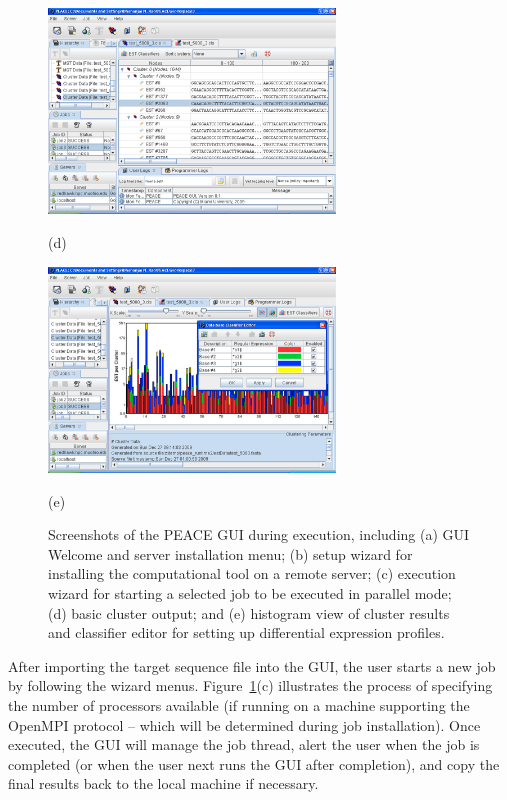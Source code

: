 \documentclass[a4,center,fleqn]{NAR}
\newcommand{\peace} {{\small PEACE}}
\begin{document}
\begin{figure}
  \begin{minipage}{3in}
    \includegraphics[width=3in]{screen.d/cluster_list_big.png}
    \centerline{\small{(d)}}
  \end{minipage}
  \begin{minipage}{1in}
    \hspace{1in}
  \end{minipage}
  \begin{minipage}{3in}
    \includegraphics[width=3in]{screen.d/classifier_big.png}
    \centerline{\small{(e)}}
  \end{minipage}

  \caption{Screenshots of the \peace\/ GUI during execution, including (a)
    GUI Welcome and server installation menu; (b) setup wizard for
    installing the computational tool on a remote server; (c) execution
    wizard for starting a selected job to be executed in parallel mode;
    (d) basic cluster output; and (e) histogram view of cluster results
    and classifier editor for setting up differential expression profiles.}\label{screen}
\end{figure}

 After importing the target sequence
file into the GUI, the user starts a new job by following the wizard
menus.  Figure~\ref{screen}(c) illustrates the process of specifying
the number of processors available (if running on a machine supporting
the OpenMPI protocol -- which will be determined during job
installation).  Once executed, the GUI will manage the job thread,
alert the user when the job is completed (or when the user next runs
the GUI after completion), and copy the final results back to the
local machine if necessary.
\end{document}
